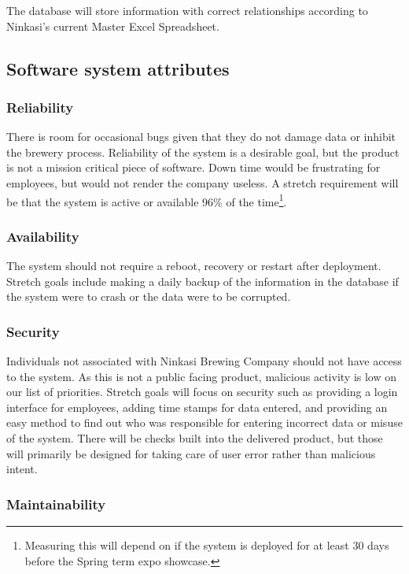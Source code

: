 \documentclass[draftclsnofoot,onecolumn,letterpaper,10pt,compsoc]{IEEEtran}
\begin{document}
		The database will store information with correct relationships according to Ninkasi's current Master Excel Spreadsheet.

	\subsection{Software system attributes}
		\subsubsection{Reliability}

		There is room for occasional bugs given that they do not damage data or inhibit the brewery process.
		Reliability of the system is a desirable goal, but the product is not a mission critical piece of software.
		Down time would be frustrating for employees, but would not render the company useless.
        A stretch requirement will be that the system is active or available 96\% of the time\footnote{Measuring this will depend on if the system is deployed for at least 30 days before the Spring term expo showcase.}.

		\subsubsection{Availability}

		The system should not require a reboot, recovery or restart after deployment.
		Stretch goals include making a daily backup of the information in the database if the system were to crash or the data were to be corrupted.

		\subsubsection{Security}

		Individuals not associated with Ninkasi Brewing Company should not have access to the system.
		As this is not a public facing product, malicious activity is low on our list of priorities.
		Stretch goals will focus on security such as providing a login interface for employees, adding time stamps for data entered, and providing an easy method to find out who was responsible for entering incorrect data or misuse of the system.
		There will be checks built into the delivered product, but those will primarily be designed for taking care of user error rather than malicious intent.

		\subsubsection{Maintainability}
\end{document}

